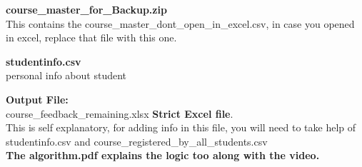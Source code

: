 \documentclass[12pt,  letterpaper,  twoside]{article}
\begin{document}
\textbf{course\_master\_for\_Backup.zip}\\
This contains the course\_master\_dont\_open\_in\_excel.csv, in case you opened in excel, replace that file with this one.

\textbf{studentinfo.csv}\\
personal info about student 

\textbf{Output File:}\\
course\_feedback\_remaining.xlsx   \textbf{Strict Excel file}.\\
This is self explanatory, for adding info in this file, you will need to take help of studentinfo.csv and course\_registered\_by\_all\_students.csv\\

\textbf{The algorithm.pdf explains the logic too along with the video.}
 
\end{document}
